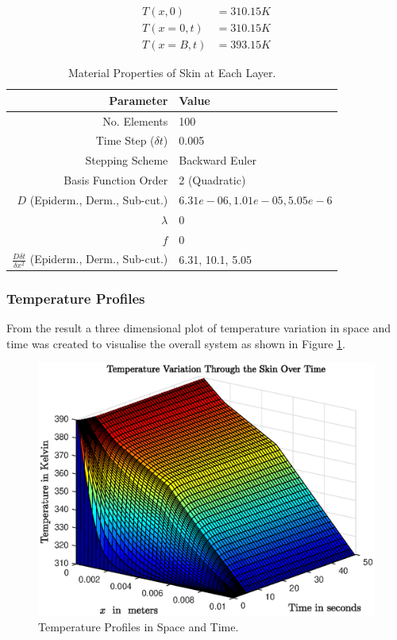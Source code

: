 \documentclass[11pt]{article}
\newcommand{\ra}[1]{\renewcommand{\arraystretch}{#1}}
\begin{document}
\begin{subequations}\label{eq:q2conds}
\begin{align}
T(x,0) &= 310.15K \label{eq:q2ic} \\ 
T(x = 0,t) &= 310.15K \label{eq:q2lhbc} \\  
T(x = B, t)&=  393.15K \label{eq:q2rhbc}
\end{align}
\end{subequations}


\begin{table}[!h]
\centering %
\ra{1.3}
\begin{tabular}{@{}rl@{}}\toprule
 \textbf{Parameter}  & \textbf{Value}  \\
\midrule
No. Elements  & 100  \\
Time Step ($\delta t$) & 0.005   \\
Stepping Scheme & Backward Euler  \\
Basis Function Order & 2 (Quadratic)  \\
\midrule
$D$ (Epiderm., Derm., Sub-cut.) &  $6.31e-06, 1.01e-05, 5.05e-6$ \\
$\lambda$ & 0 \\
$f$  &0 \\
$\frac{D \delta t}{\delta x^2}$  (Epiderm., Derm., Sub-cut.)  & 6.31, 10.1, 5.05 \\
\bottomrule
\end{tabular}
\caption{Material Properties of Skin at Each Layer.}
\label{table:q1setup}
\end{table}

\clearpage
\FloatBarrier
\subsubsection{ Temperature Profiles}
From the result a three dimensional plot of temperature variation in space and time was created to visualise the overall system as shown in Figure \ref{fig:surf1}. 
\FloatBarrier
\begin{figure}[!h]  %
	\centering
	\includegraphics[width=.75\textwidth]{ManualSurf.eps}
    \caption{Temperature Profiles in Space and Time. }\label{fig:surf1}
\end{figure}
\FloatBarrier
\end{document}
